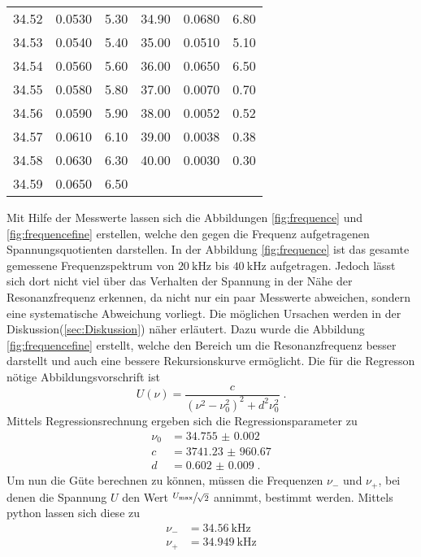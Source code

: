 \begin{table}
\begin{tabular} {S[table-format=2.2] S[table-format=1.4] S[table-format=1.2] S[table-format=2.2] S[table-format=1.4] S[table-format=1.2]}
    34.52 & 0.0530 & 5.30 & 34.90 & 0.0680 & 6.80\\
    34.53 & 0.0540 & 5.40 & 35.00 & 0.0510 & 5.10\\
    34.54 & 0.0560 & 5.60 & 36.00 & 0.0650 & 6.50\\
    34.55 & 0.0580 & 5.80 & 37.00 & 0.0070 & 0.70\\
    34.56 & 0.0590 & 5.90 & 38.00 & 0.0052 & 0.52\\
    34.57 & 0.0610 & 6.10 & 39.00 & 0.0038 & 0.38\\
    34.58 & 0.0630 & 6.30 & 40.00 & 0.0030 & 0.30\\
    34.59 & 0.0650 & 6.50 & { }   & { }    & { } \\
    \bottomrule
\end{tabular}
\end{table}
Mit Hilfe der Messwerte lassen sich die Abbildungen \ref{fig:frequence} und \ref{fig:frequencefine} erstellen, welche den gegen die Frequenz
aufgetragenen Spannungsquotienten darstellen.
In der Abbildung \ref{fig:frequence} ist das gesamte gemessene Frequenzspektrum von $\SI{20}{\kilo\hertz}$ bis $\SI{40}{\kilo\hertz}$ aufgetragen.
Jedoch lässt sich dort nicht viel über das Verhalten der Spannung in der Nähe der Resonanzfrequenz erkennen, da nicht nur ein paar Messwerte abweichen, sondern eine
systematische Abweichung vorliegt. Die möglichen Ursachen werden in der Diskussion(\ref{sec:Diskussion}) näher erläutert.  
Dazu wurde die Abbildung \ref{fig:frequencefine} erstellt, welche den Bereich um  die Resonanzfrequenz besser darstellt und auch eine bessere 
Rekursionskurve ermöglicht.
Die für die Regresson nötige Abbildungsvorschrift ist 
\begin{equation}
    U (\nu) = \frac{c}{\left( \nu^2 - \nu_0^2 \right)^2 + d^2 \nu_0^2} \; \text{.}
\end{equation}
Mittels Regressionsrechnung ergeben sich die Regressionsparameter zu 
\begin{align*}
    \nu_0 & =\num{34.755(2)}       \\
    c     & =\num{3741.23(96067)}  \\
    d     & =\num{0.602(9)} \; \text{.}
\end{align*}
Um nun die Güte berechnen zu können, müssen die Frequenzen $\nu_-$ und $\nu_+$, bei denen die Spannung $U$ den Wert $\sfrac{U_\text{max}}{\sqrt{2}}$ annimmt, bestimmt werden.
Mittels python lassen sich diese zu
\begin{align*}
    \nu_- &= \SI{34.56}{\kilo\hertz} \\
    \nu_+ &= \SI{34.949}{\kilo\hertz}
\end{align*}
